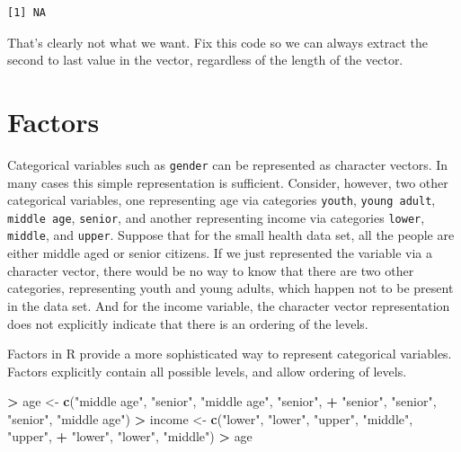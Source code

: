 \documentclass[
]{krantz}
\makeatletter
\newenvironment{Shaded}{\begin{snugshade}}{\end{snugshade}}
\newcommand{\KeywordTok}[1]{\textcolor[rgb]{0.27,0.27,0.27}{\textbf{#1}}}
\newcommand{\NormalTok}[1]{#1}
\newcommand{\OperatorTok}[1]{\textcolor[rgb]{0.43,0.43,0.43}{\textbf{#1}}}
\newcommand{\StringTok}[1]{\textcolor[rgb]{0.5,0.5,0.5}{#1}}
\newenvironment{kframe}{%
\medskip{}
\setlength{\fboxsep}{.8em}
 \def\at@end@of@kframe{}%
 \ifinner\ifhmode%
  \def\at@end@of@kframe{\end{minipage}}%
  \begin{minipage}{\columnwidth}%
 \fi\fi%
 \def\FrameCommand##1{\hskip\@totalleftmargin \hskip-\fboxsep
 \colorbox{shadecolor}{##1}\hskip-\fboxsep
     \hskip-\linewidth \hskip-\@totalleftmargin \hskip\columnwidth}%
 \MakeFramed {\advance\hsize-\width
   \@totalleftmargin\z@ \linewidth\hsize
   \@setminipage}}%
 {\par\unskip\endMakeFramed%
 \at@end@of@kframe}
\renewenvironment{Shaded}{\begin{kframe}}{\end{kframe}}
\makeatother
\begin{document}
\begin{verbatim}
[1] NA
\end{verbatim}

That's clearly not what we want. Fix this code so we can always extract the second to last value in the vector, regardless of the length of the vector.

\hypertarget{factors}{%
\section{Factors}\label{factors}}

Categorical variables such as \texttt{gender} can be represented as character vectors. In many cases this simple representation is sufficient. Consider, however, two other categorical variables, one representing age via categories \texttt{youth}, \texttt{young\ adult}, \texttt{middle\ age}, \texttt{senior}, and another representing income via categories \texttt{lower}, \texttt{middle}, and \texttt{upper}. Suppose that for the small health data set, all the people are either middle aged or senior citizens. If we just represented the variable via a character vector, there would be no way to know that there are two other categories, representing youth and young adults, which happen not to be present in the data set. And for the income variable, the character vector representation does not explicitly indicate that there is an ordering of the levels.

Factors in R provide a more sophisticated way to represent categorical variables. Factors explicitly contain all possible levels, and allow ordering of levels.

\begin{Shaded}
\begin{Highlighting}[]
\OperatorTok{\textgreater{}}\StringTok{ }\NormalTok{age \textless{}{-}}\StringTok{ }\KeywordTok{c}\NormalTok{(}\StringTok{"middle age"}\NormalTok{, }\StringTok{"senior"}\NormalTok{, }\StringTok{"middle age"}\NormalTok{, }\StringTok{"senior"}\NormalTok{,}
\OperatorTok{+}\StringTok{          "senior"}\NormalTok{, }\StringTok{"senior"}\NormalTok{, }\StringTok{"senior"}\NormalTok{, }\StringTok{"middle age"}\NormalTok{)}
\OperatorTok{\textgreater{}}\StringTok{ }\NormalTok{income \textless{}{-}}\StringTok{ }\KeywordTok{c}\NormalTok{(}\StringTok{"lower"}\NormalTok{, }\StringTok{"lower"}\NormalTok{, }\StringTok{"upper"}\NormalTok{, }\StringTok{"middle"}\NormalTok{, }\StringTok{"upper"}\NormalTok{,}
\OperatorTok{+}\StringTok{             "lower"}\NormalTok{, }\StringTok{"lower"}\NormalTok{, }\StringTok{"middle"}\NormalTok{)}
\OperatorTok{\textgreater{}}\StringTok{ }\NormalTok{age}
\end{Highlighting}
\end{Shaded}
\end{document}
